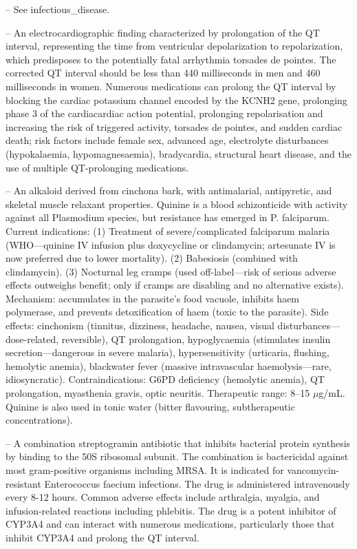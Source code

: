 -- See infectious\_disease.

-- An electrocardiographic finding characterized by prolongation of the QT interval, representing the time from ventricular depolarization to repolarization, which predisposes to the potentially fatal arrhythmia torsades de pointes. The corrected QT interval should be less than 440 milliseconds in men and 460 milliseconds in women. Numerous medications can prolong the QT interval by blocking the cardiac potassium channel encoded by the KCNH2 gene, prolonging phase 3 of the cardiacardiac action potential, prolonging repolarisation and increasing the risk of triggered activity, torsades de pointes, and sudden cardiac death; risk factors include female sex, advanced age, electrolyte disturbances (hypokalaemia, hypomagnesaemia), bradycardia, structural heart disease, and the use of multiple QT-prolonging medications.

-- An alkaloid derived from cinchona bark, with antimalarial, antipyretic, and skeletal muscle relaxant properties. Quinine is a blood schizonticide with activity against all Plasmodium species, but resistance has emerged in P. falciparum. Current indications: (1) Treatment of severe/complicated falciparum malaria (WHO—quinine IV infusion plus doxycycline or clindamycin; artesunate IV is now preferred due to lower mortality). (2) Babesiosis (combined with clindamycin). (3) Nocturnal leg cramps (used off-label—risk of serious adverse effects outweighs benefit; only if cramps are disabling and no alternative exists). Mechanism: accumulates in the parasite's food vacuole, inhibits haem polymerase, and prevents detoxification of haem (toxic to the parasite). Side effects: cinchonism (tinnitus, dizziness, headache, nausea, visual disturbances—dose-related, reversible), QT prolongation, hypoglycaemia (stimulates insulin secretion—dangerous in severe malaria), hypersensitivity (urticaria, flushing, hemolytic anemia), blackwater fever (massive intravascular haemolysis—rare, idiosyncratic). Contraindications: G6PD deficiency (hemolytic anemia), QT prolongation, myasthenia gravis, optic neuritis. Therapeutic range: 8--15 \(\mu\)g/mL. Quinine is also used in tonic water (bitter flavouring, subtherapeutic concentrations).

-- A combination streptogramin antibiotic that inhibits bacterial protein synthesis by binding to the 50S ribosomal subunit. The combination is bactericidal against most gram-positive organisms including MRSA. It is indicated for vancomycin-resistant Enterococcus faecium infections. The drug is administered intravenously every 8-12 hours. Common adverse effects include arthralgia, myalgia, and infusion-related reactions including phlebitis. The drug is a potent inhibitor of CYP3A4 and can interact with numerous medications, particularly those that inhibit CYP3A4 and prolong the QT interval.

